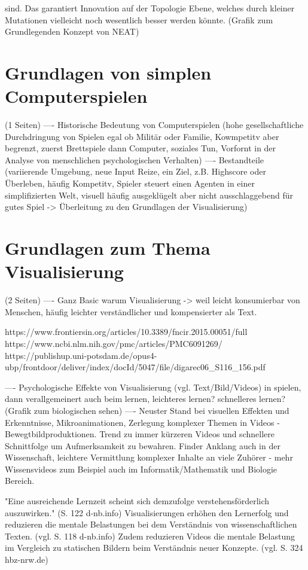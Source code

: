 sind. Das garantiert Innovation auf der Topologie Ebene, welches durch kleiner Mutationen vielleicht noch wesentlich besser werden könnte. (Grafik zum Grundlegenden Konzept von NEAT)

\section{Grundlagen von simplen Computerspielen}
(1 Seiten)
---- Historische Bedeutung von Computerspielen (hohe gesellschaftliche Durchdringung von Spielen egal ob Militär oder Familie, Kowmpetitv aber begrenzt, zuerst Brettspiele dann Computer, soziales Tun, Vorfornt in der Analyse von menschlichen psychologischen Verhalten)
---- Bestandteile (variierende Umgebung, neue Input Reize, ein Ziel, z.B. Highscore oder Überleben, häufig Kompetitv, Spieler steuert einen Agenten in einer simplifizierten Welt, visuell häufig ausgeklügelt aber nicht ausschlaggebend für gutes Spiel -> Überleitung zu den Grundlagen der Visualisierung)

\section{Grundlagen zum Thema Visualisierung}
(2 Seiten)
---- Ganz Basic warum Visualisierung -> weil leicht konsumierbar von Menschen, häufig leichter verständlicher und kompensierter als Text. 

https://www.frontiersin.org/articles/10.3389/fncir.2015.00051/full
https://www.ncbi.nlm.nih.gov/pmc/articles/PMC6091269/
https://publishup.uni-potsdam.de/opus4-ubp/frontdoor/deliver/index/docId/5047/file/digarec06\_S116\_156.pdf


---- Psychologische Effekte von Visualisierung (vgl. Text/Bild/Videos) in spielen, dann verallgemeinert auch beim lernen, leichteres lernen? schnelleres lernen? (Grafik zum biologischen sehen) 
---- Neuster Stand bei visuellen Effekten und Erkenntnisse, Mikroanimationen, Zerlegung komplexer Themen in Videos - Bewegtbildproduktionen. Trend zu immer kürzeren Videos und schnellere Schnittfolge um Aufmerksamkeit zu bewahren. Finder Anklang auch in der Wissenschaft, leichtere Vermittlung komplexer Inhalte an viele Zuhörer - mehr Wissensvideos zum Beispiel auch im Informatik/Mathematik und Biologie Bereich. 

"Eine ausreichende Lernzeit scheint sich
demzufolge verstehensförderlich auszuwirken." (S. 122 d-nb.info)
Visualisierungen erhöhen den Lernerfolg und reduzieren die mentale Belastungen bei dem Verständnis von wissenschaftlichen Texten. (vgl. S. 118 d-nb.info)
Zudem reduzieren Videos die mentale Belastung im Vergleich zu statischen Bildern beim Verständnis neuer Konzepte. (vgl. S. 324 hbz-nrw.de)